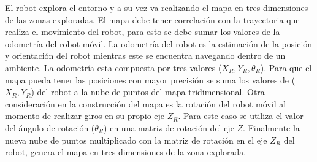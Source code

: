 El robot explora el entorno y a su vez va realizando el mapa en tres dimensiones de las zonas
exploradas. El mapa debe tener correlación con la trayectoria que realiza el movimiento del 
robot, para esto se debe sumar los valores de la odometría del robot móvil. La odometría del 
robot es la estimación de la posición y orientación del robot mientras este se encuentra 
navegando dentro de un ambiente. La odometría esta compuesta por tres valores ($X_{R}, Y_{R}, 
\theta_{R}$). Para que el mapa pueda tener las posiciones con mayor precisión se suma los 
valores de ($X_{R}, Y_{R}$) del robot a la nube de puntos del mapa tridimensional. Otra
consideración en la construcción del mapa es la rotación del robot móvil al momento de 
realizar giros en su propio eje $Z_{R}$. Para este caso se utiliza el valor del ángulo 
de rotación ($\theta_{R}$) en una matriz de rotación del eje $Z$. Finalmente la nueva nube 
de puntos multiplicado con la matriz de rotación en el eje $Z_{R}$ del robot, genera el mapa 
en tres dimensiones de la zona explorada.
